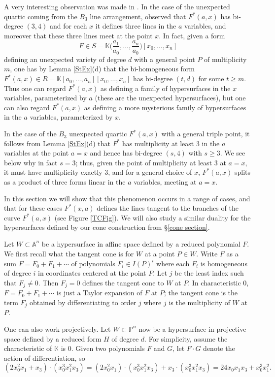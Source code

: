 \documentclass[12pt]{amsart}
\numberwithin{equation}{section}
\theoremstyle{definition}
\newcommand{\Ab}{ \ensuremath{\mathbb{A}}}
\newcommand{\PP}{ \ensuremath{\mathbb{P}}}
\newcommand{\KK}{ \ensuremath{\mathbb{K}}}
\begin{document}
A very interesting observation was made in \cite{BMSS}. In the case of the unexpected quartic coming from the $B_3$ line arrangement,
\cite{BMSS} observed that $F^*(a,x)$ has bi-degree $(3,4)$ and for each $x$ it defines three lines 
in the $a$ variables, and moreover that these three lines meet at the point $x$.
In fact, given a form 
$$F\in S=\KK\big(\frac{a_1}{a_0},\ldots,\frac{a_n}{a_0}\big)[x_0,\ldots,x_n]$$
defining an unexpected variety of degree $d$ with a general point $P$ of multiplicity $m$,
one has by Lemma \ref{StEx}(d) that the bi-homogeneous form $F^*(a,x)\in R=\KK[a_0,\ldots,a_n][x_0,\ldots,x_n]$ has bi-degree $(t,d)$
for some $t\geq m$. Thus one can regard $F^*(a,x)$ as defining a family of hypersurfaces in the $x$ variables, parameterized by $a$
(these are the unexpected hypersurfaces), but one can also regard 
$F^*(a,x)$ as defining a more mysterious family of hypersurfaces in the $a$ variables, parameterized by $x$.

In the case of the $B_3$ unexpected quartic $F^*(a,x)$ with a general triple point, it follows from Lemma \ref{StEx}(d) that
$F^*$ has multiplicity at least 3 in the $a$ variables at the point $a=x$ and hence has bi-degree $(s,4)$ with $s\geq 3$.
We see below why in fact $s=3$; thus, given the point of multiplicity at least 3 at $a=x$,
it must have multiplicity exactly 3, and for a general choice of $x$, $F^*(a,x)$ splits as a product of three 
forms linear in the $a$ variables, meeting at $a=x$.

In this section we will show that this phenomenon occurs in a range of cases, 
and that for these cases $F^*(x,a)$ defines the lines tangent to the branches of the curve $F^*(a,x)$
(see Figure \ref{TCFig}). We will also study a similar duality for the hypersurfaces defined by our cone construction
from \S\ref{cone section}.

Let $W\subset \Ab^n$ be a hypersurface in affine space defined by a reduced polynomial $F$.
We first recall what the tangent cone is for $W$ at a point $P\in W$.
Write $F$ as a sum $F=F_0+F_1+\cdots$ of polynomials $F_i \in I(P)^i$ where each 
$F_i$ is homogeneous of degree $i$ in coordinates centered at the point $P$.
Let $j$ be the least index such that $F_j\neq0$. Then $F_j=0$ defines the tangent cone
to $W$ at $P$. In characteristic 0, $F=F_0+F_1+\cdots$ is just a Taylor expansion of $F$ at $P$; the tangent 
cone is the term $F_j$ obtained by differentiating to order $j$ where $j$ is the multiplicity of $W$ at $P$.

One can also work projectively. Let $W\subset \PP^n$ now be a hypersurface in projective space defined by a reduced form $H$
of degree $d$. For simplicity, assume the characteristic of $\KK$ is 0.
Given two polynomials $F$ and $G$, let $F\cdot G$ denote the action of differentiation, so 
$$(2x_0^2x_1+x_3)\cdot (x_0^3x_1^2x_3)=(2x_0^2x_1)\cdot (x_0^3x_1^2x_3)+x_3\cdot (x_0^3x_1^2x_3)=24x_0x_1x_3+x_0^3x_1^2.$$
\end{document}
